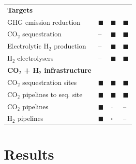 \documentclass[pdflatex,sn-nature]{sn-jnl}
\theoremstyle{thmstyleone}%
\theoremstyle{thmstyletwo}%
\theoremstyle{thmstylethree}%
\begin{document}
\begin{table}[htbp]
\begin{tabularx}{\linewidth}{R{4.2cm}>{\centering\arraybackslash}X>{\centering\arraybackslash}X>{\centering\arraybackslash}X}
    \midrule
    \textbf{Targets} & & & \\
    GHG emission reduction &  $\blacksquare$ &  $\blacksquare$ &  $\blacksquare$ \\
    CO$_2$ sequestration &  -- &  $\blacksquare$ &  $\blacksquare$ \\
    Electrolytic H$_2$ production &  -- &  $\blacksquare$ &  $\blacksquare$ \\
    H$_2$ electrolysers &  -- &  $\blacksquare$ &  $\blacksquare$ \\
    \midrule
    \textbf{CO$_2$ + H$_2$ infrastructure} & & & \\
    CO$_2$ sequestration sites & $\blacksquare$ &  $\blacksquare$ &  $\blacksquare$ \\
    CO$_2$ pipelines to seq. site & $\blacksquare$ &  $\blacksquare$ &  $\blacksquare$ \\
    CO$_2$ pipelines & $\blacksquare$ &  $\square$ &  -- \\
    H$_2$ pipelines & $\blacksquare$ &  $\square$ &  -- \\
    \bottomrule
  \end{tabularx}
  \centering
\end{table}

\section{Results}\label{sec:results}
\end{document}

